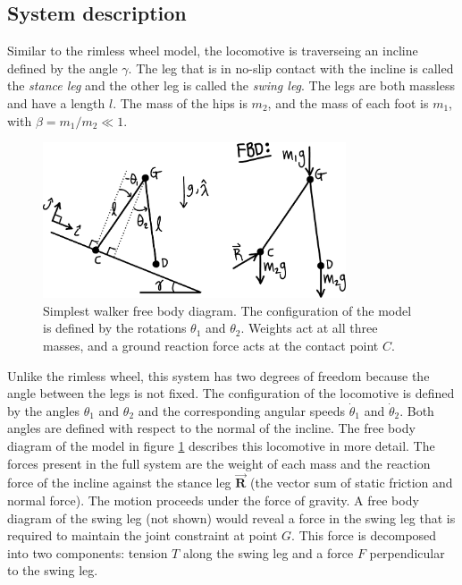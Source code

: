 \subsection*{System description}
\label{sec:SimplestWalkerSystemDescription}

Similar to the rimless wheel model, the locomotive is traverseing an incline
defined by the angle $\gamma$. The leg that is in no-slip contact with the
incline is called the \textit{stance leg} and the other leg is called the
\textit{swing leg}. The legs are both
massless and have a length $l$. The mass of the hips is $m_{2}$, and the mass
of each foot is $m_{1}$, with $\beta = m_{1} / m_{2} \ll 1$.

\begin{figure}[h]		%
\begin{centering}
\includegraphics[width=0.8\textwidth]{Figures/SimplestWalkerFBD}\par
\end{centering}
\caption[Diagram: Simplest Walker Free Body Diagram]{Simplest walker free body diagram. The configuration of the model is defined by the rotations $\theta_{1}$ and $\theta_{2}$. Weights act at all three masses, and a ground reaction force acts at the contact point $C$.}
\label{fig:SimplestWalkerFBD}
\end{figure}
%

Unlike the rimless wheel, this system has two degrees of freedom because the
angle between the legs is not fixed. The configuration of the locomotive is
defined by the angles $\theta_1$ and $\theta_2$ and the corresponding angular
speeds $\dot{\theta}_1$ and $\dot{\theta}_2$. Both angles are defined with
respect to the normal of the incline. The free body diagram of the model in
figure \ref{fig:SimplestWalkerFBD} describes this locomotive in more detail.
The forces present in the full system are the weight of each mass and the
reaction force of the incline against the stance leg $\vec{\mathbf{R}}$ (the
vector sum of static friction and normal force). The motion proceeds under the
force of gravity. A free body diagram of the swing leg (not shown) would reveal
a force in the swing leg that is required to maintain the joint constraint at
point $G$. This force is decomposed into two components: tension $T$ along the
swing leg and a force $F$ perpendicular to the swing leg.

